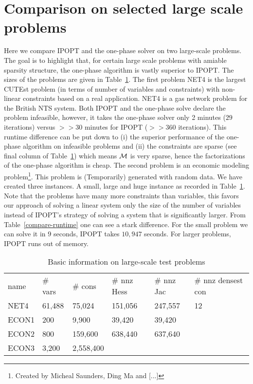 \documentclass{article}
\begin{document}
\section{Comparison on selected large scale problems}

Here we compare IPOPT and the one-phase solver on two large-scale problems. The goal is to highlight that, for certain large scale problems with amiable sparsity structure, the one-phase algorithm is vastly superior to IPOPT. The sizes of the problems are given in Table~\ref{large-scale:basic-info}. The first problem NET4 is the largest CUTEst problem (in terms of number of variables and constraints) with non-linear constraints based on a real application. NET4 is a gas network problem for the British NTS system. Both IPOPT and the one-phase solve declare the problem infeasible, however, it takes the one-phase solver only 2 minutes ($29$ iterations) versus $>>30$ minutes for IPOPT ($>>360$ iterations). This runtime difference can be put down to (i) the superior performance of the one-phase algorithm on infeasible problems and (ii) the constraints are sparse (see final column of Table~\ref{large-scale:basic-info}) which means $\mathcal{M}$ is very sparse, hence the factorizations of the one-phase algorithm is cheap. The second problem is an economic modeling problem\footnote{Created by Micheal Saunders, Ding Ma and [...]}. This problem is (Temporarily) generated with random data. We have created three instances. A small, large and huge instance as recorded in Table~\ref{large-scale:basic-info}. Note that the problems have many more constraints than variables, this favors our approach of solving a linear system only the size of the number of variables instead of IPOPT's strategy of solving a system that is significantly larger. From Table~\ref{compare-runtime} one can see a stark difference. For the small problem we can solve it in $9$ seconds, IPOPT takes $10,947$ seconds. For larger problems, IPOPT runs out of memory.

\begin{table}[H]
\begin{tabular}{l l l l l l}
name &  \# vars & \# cons & \# nnz Hess & \# nnz Jac & \# nnz densest con  \\ 
NET4 & 61,488 & 75,024  & 151,056 & 247,557 & 12 \\  
ECON1 &  200 & 9,900 & 39,420 & 39,420 &  \\
ECON2 & 800 & 159,600 & 638,440 & 637,640 & \\
ECON3 & 3,200 & 2,558,400 &  & 
\end{tabular}
\caption{Basic information on large-scale test problems}\label{large-scale:basic-info}
\end{table}
\end{document}
